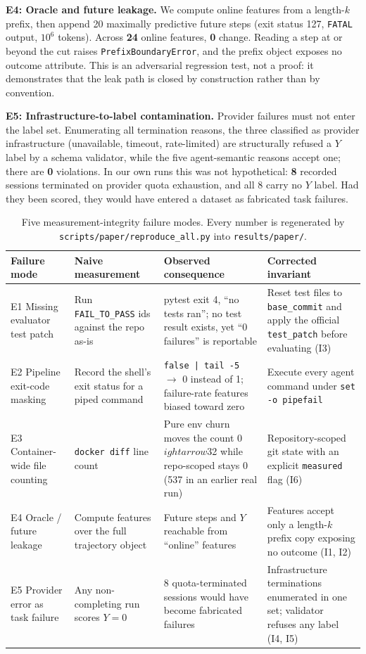 \documentclass[letterpaper]{article}
\begin{document}
\textbf{E4: Oracle and future leakage.} We compute online features from a
length-$k$ prefix, then append 20 maximally predictive future steps (exit status
127, \texttt{FATAL} output, $10^6$ tokens). Across \textbf{24} online features,
\textbf{0} change. Reading a step at or beyond the cut raises
\texttt{PrefixBoundaryError}, and the prefix object exposes no outcome
attribute. This is an adversarial regression test, not a proof: it demonstrates
that the leak path is closed by construction rather than by convention.

\textbf{E5: Infrastructure-to-label contamination.} Provider failures must not
enter the label set. Enumerating all termination reasons, the three classified
as provider infrastructure (unavailable, timeout, rate-limited) are structurally
refused a $Y$ label by a schema validator, while the five agent-semantic reasons
accept one; there are \textbf{0} violations. In our own runs this was not
hypothetical: \textbf{8} recorded sessions terminated on provider quota
exhaustion, and all 8 carry no $Y$ label. Had they been scored, they would have
entered a dataset as fabricated task failures.

\begin{table}[t]
\centering
\small
\begin{tabular}{@{}p{2.5cm}p{3.5cm}p{4.6cm}p{4.6cm}@{}}
\toprule
\textbf{Failure mode} & \textbf{Naive measurement} & \textbf{Observed consequence} & \textbf{Corrected invariant} \\
\midrule
E1 Missing evaluator test patch &
Run \texttt{FAIL\_TO\_PASS} ids against the repo as-is &
pytest exit 4, ``no tests ran''; no test result exists, yet ``0 failures'' is reportable &
Reset test files to \texttt{base\_commit} and apply the official \texttt{test\_patch} before evaluating (I3) \\
\addlinespace
E2 Pipeline exit-code masking &
Record the shell's exit status for a piped command &
\texttt{false | tail -5} $\rightarrow$ 0 instead of 1; failure-rate features biased toward zero &
Execute every agent command under \texttt{set -o pipefail} \\
\addlinespace
E3 Container-wide file counting &
\texttt{docker diff} line count &
Pure env churn moves the count 0$
ightarrow$32 while repo-scoped stays 0 (537 in an earlier real run) &
Repository-scoped git state with an explicit \texttt{measured} flag (I6) \\
\addlinespace
E4 Oracle / future leakage &
Compute features over the full trajectory object &
Future steps and $Y$ reachable from ``online'' features &
Features accept only a length-$k$ prefix copy exposing no outcome (I1, I2) \\
\addlinespace
E5 Provider error as task failure &
Any non-completing run scores $Y=0$ &
8 quota-terminated sessions would have become fabricated failures &
Infrastructure terminations enumerated in one set; validator refuses any label (I4, I5) \\
\bottomrule
\end{tabular}
\caption{Five measurement-integrity failure modes. Every number is regenerated
by \texttt{scripts/paper/reproduce\_all.py} into \texttt{results/paper/}.}
\end{table}
\end{document}
